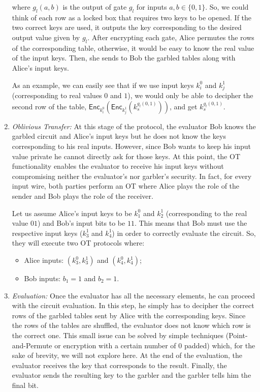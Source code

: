 \begin{enumerate}
    where $g_l(a,b)$ is the output of gate $g_l$ for inputs $a, b\in \{0, 1\}$. So, we could think of each row as a locked box that requires two keys to be opened. If the two correct keys are used, it outputs the key corresponding to the desired output value given by $g_l$. After encrypting each gate, Alice permutes the rows of the corresponding table, otherwise, it would be easy to know the real value of the input keys. Then, she sends to Bob the garbled tables along with Alice's input keys.
    
    As an example, we can easily see that if we use input keys $k_i^0$ and $k_j^1$ (corresponding to real values $0$ and $1$), we would only be able to decipher the second row of the table, $\mathsf{Enc}_{k_i^0}(\mathsf{Enc}_{k_j^1}(k_s^{g_l(0,1)}))$, and get $k_s^{g_l(0,1)}$.
    
    \item \textit{Oblivious Transfer:} At this stage of the protocol, the evaluator Bob knows the garbled circuit and Alice's input keys but he does not know the keys corresponding to his real inputs. However, since Bob wants to keep his input value private he cannot directly ask for those keys. At this point, the OT functionality enables the evaluator to receive his input keys without compromising neither the evaluator's nor garbler's security. In fact, for every input wire, both parties perform an OT where Alice plays the role of the sender and Bob plays the role of the receiver. 
    
    Let us assume Alice's input keys to be $k_1^0$ and $k_2^1$ (corresponding to the real value  $01$) and Bob's input bits to be $11$. This means that Bob must use the respective input keys ($k_3^1$ and $k_4^1$) in order to correctly evaluate the circuit. So, they will execute two OT protocols where:
    
    \begin{itemize}
        \item Alice inputs: $(k_3^0, k_3^1)$ and $(k_4^0, k_4^1)$;
        \item Bob inputs: $b_1 = 1$ and $b_2 = 1$.
    \end{itemize}
    
    \item \textit{Evaluation:} Once the evaluator has all the necessary elements, he can proceed with the circuit evaluation. In this step, he simply has to decipher the correct rows of the garbled tables sent by Alice with the corresponding keys. Since the rows of the tables are shuffled, the evaluator does not know which row is the correct one. This small issue can be solved by simple techniques (Point-and-Permute or encryption with a certain number of $0$ padded) which, for the sake of brevity, we will not explore here. At the end of the evaluation, the evaluator receives the key that corresponds to the result. Finally, the evaluator sends the resulting key to the garbler and the garbler tells him the final bit.
    

\end{enumerate}
